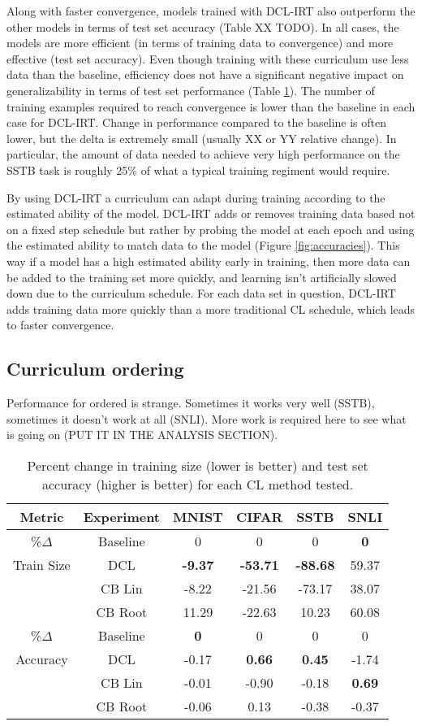 \documentclass[letterpaper]{article} %
\begin{document}
Along with faster convergence, models trained with DCL-IRT also outperform the other models in terms of test set accuracy (Table XX TODO).
In all cases, the models are more efficient (in terms of training data to convergence) and more effective (test set accuracy).
Even though training with these curriculum use less data than the baseline, efficiency does not have a significant negative impact on generalizability in terms of test set performance (Table \ref{tab:costs}).
The number of training examples required to reach convergence is lower than the baseline in each case for DCL-IRT.
Change in performance compared to the baseline is often lower, but the delta is extremely small (usually XX or YY relative change). 
In particular, the amount of data needed to achieve very high performance on the SSTB task is roughly 25\% of what a typical training regiment would require.


By using DCL-IRT a curriculum can adapt during training according to the estimated ability of the model.
DCL-IRT adds or removes training data based not on a fixed step schedule but rather by probing the model at each epoch and using the estimated ability to match data to the model (Figure \ref{fig:accuracies}).
This way if a model has a high estimated ability early in training, then more data can be added to the training set more quickly, and learning isn't artificially slowed down due to the curriculum schedule.
For each data set in question, DCL-IRT adds training data more quickly than a more traditional CL schedule, which leads to faster convergence.

\subsection{Curriculum ordering}
Performance for ordered is strange.
Sometimes it works very well (SSTB), sometimes it doesn't work at all (SNLI).
More work is required here to see what is going on (PUT IT IN THE ANALYSIS SECTION).



\begin{table}[h!]
	\centering 
	\small 
	\begin{tabular}{cccccc}
		\toprule
		Metric&Experiment  &MNIST & CIFAR & SSTB & SNLI \\
		\midrule
		 \%$\Delta$ & Baseline &0&0&0&\bf 0\\ 
		 Train Size&DCL &\bf -9.37&\bf -53.71&\bf -88.68&59.37\\ 
		 &CB Lin &-8.22&-21.56&-73.17&38.07\\ 
		 &CB Root &11.29&-22.63&10.23&60.08 \\
		 \midrule
		 \%$\Delta$ & Baseline &\bf 0&0&0&0\\ 
		 Accuracy&DCL &-0.17&\bf 0.66&\bf 0.45&-1.74\\ 
		 &CB Lin &-0.01&-0.90&-0.18&\bf 0.69\\ 
		 &CB Root &-0.06&0.13&-0.38&-0.37 \\
		\bottomrule 
	\end{tabular}
	\caption{Percent change in training size (lower is better) and test set accuracy (higher is better) for each CL method tested.}
	\label{tab:costs}
\end{table}
\end{document}
